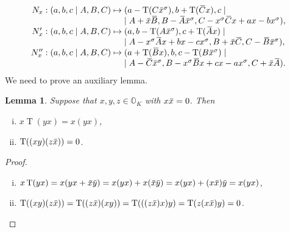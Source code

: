 \documentclass{amsart}
\def\ovA{\mathord{\mbox{\hspace*{0pt}}\,\overline{\!A\!\!\;}\!\:}\mbox{\hspace*{0pt}}}
\def\ovB{\mathord{\mbox{\hspace*{0pt}}\,\overline{\!B\!\!\;}\!\:}\mbox{\hspace*{0pt}}}
\def\ovC{\mathord{\mbox{\hspace*{0pt}}\,\overline{\!C\!\!\;}\!\:}\mbox{\hspace*{0pt}}}
\def\ovx{\mathord{\mbox{\hspace*{0pt}}\,\overline{\!x\!\!\;}\!\:}\mbox{\hspace*{0pt}}}
\def\ovy{\mathord{\mbox{\hspace*{0pt}}\,\overline{\!y\!\!\;}\!\:}\mbox{\hspace*{0pt}}}
\def\OO{\mathord{\mathbb{O}}}
\newcommand{\Tr}{\operatorname{T}}
\newcommand{\s}{\sigma}
\theoremstyle{plain}
\numberwithin{theorem}{section}
\newtheorem{lemma}[theorem]{Lemma}
\theoremstyle{definition}
\begin{document}
\begin{equation}
	\label{eq:5_nx_image}
	\begin{array}{r@{\;}c@{\;}l}
		N_x: (a,b,c\mid A,B,C) & \mapsto &
		(a-\Tr(C\ovx ^{\s}), b+\Tr(\ovC x), c \mid \\
		& & \mid	A+\ovx \ovB , B-\ovA \ovx ^{\s},C-x^{\s}\ovC x+ax-bx^{\s}), \\
		
		N_x': (a,b,c\mid A,B,C) & \mapsto & 
		(a, b-\Tr(A \ovx^{\s}), c+\Tr(\ovA x) \mid \\
		& & \mid	A - x^{\s} \ovA x + bx-cx^{\s}, B + \ovx \ovC, C - \ovB \ovx^{\s}), \\
		
		N_x'': (a,b,c\mid A,B,C) & \mapsto &
		(a+\Tr(\ovB x), b, c-\Tr(B\ovx^{\s}) \mid \\
		& & \mid 	A-\ovC\ovx^{\s}, B-x^{\s}\ovB x + cx - ax^{\s}, C+\ovx\ovA).
	\end{array}
\end{equation}
We need to prove an auxiliary lemma.

\begin{lemma}
	\label{lemma:5_oct_aux}
Suppose that $x,y,z \in \OO_K$ with $x \ovx  = 0$. Then
		\begin{enumerate}[(i)]
			\item $x\Tr(yx) = x(yx)$,
			\item $\Tr( (xy)(z\ovx ) ) = 0$.		
		\end{enumerate}
\end{lemma}

\begin{proof}
	\leavevmode
	\begin{enumerate}[(i)]
	
	\item $x\Tr(yx) = x (yx + \ovx \ovy ) = x(yx) + x(\ovx \ovy )
		 = x(yx) + (x\ovx )\ovy = x(yx)$,
		 
	\item $\Tr( (xy)(z\ovx ) ) = \Tr( (z\ovx ) (xy) ) = \Tr( ((z\ovx )x) y ) = 
		\Tr(z(x\ovx )y) = 0$. \qedhere
	\end{enumerate}
\end{proof}
\end{document}
